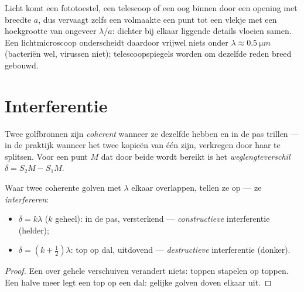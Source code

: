 \begin{remark}\label{rem:g12:light-as-wave:limits}
Licht komt een fototoestel, een telescoop of een oog binnen door een
opening met breedte $a$, dus vervaagt zelfs een volmaakte  een punt
tot een vlekje met een hoekgrootte van ongeveer $\lambda/a$: dichter bij
elkaar liggende details vloeien samen. Een lichtmicroscoop onderscheidt
daardoor vrijwel niets onder $\lambda \approx \qty{0.5}{\micro m}$
(bacteriën wel, virussen niet); telescoopspiegels worden om dezelfde reden
breed gebouwd.
\end{remark}

\section{Interferentie}

\begin{definition}\label{def:g12:light-as-wave:coherent}
Twee golfbronnen zijn \emph{coherent} wanneer ze
dezelfde  hebben en in de pas trillen --- in de praktijk wanneer
het twee kopieën van één  zijn, verkregen door haar te splitsen. Voor
een punt $M$ dat door beide wordt bereikt is het
\emph{weglengteverschil} $\delta = S_2M - S_1M$.
\end{definition}

\begin{proposition}\label{prop:g12:light-as-wave:conditions}
Waar twee coherente golven met  $\lambda$ elkaar overlappen,
tellen ze op --- ze \emph{interfereren}:
\begin{itemize}
  \item $\delta = k\lambda$ ($k$ geheel): in de pas, versterkend ---
        \emph{constructieve}
        interferentie (helder);
  \item $\delta = (k + \tfrac12)\lambda$: top op dal, uitdovend ---
        \emph{destructieve}
        interferentie (donker).
\end{itemize}
\end{proposition}

\begin{proof}
Een  over gehele  verschuiven verandert niets:
toppen stapelen op toppen. Een halve  meer legt een top op een
dal: gelijke golven doven elkaar uit.
\end{proof}

